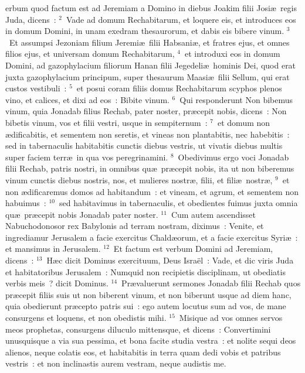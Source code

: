 \bchapter
{}erbum quod factum est ad Jeremiam a Domino in diebus Joakim filii Josi\ae\ regis Juda, dicens~:
${}^{2}$~Vade ad domum Rechabitarum, et loquere eis, et introduces eos in domum Domini, in unam exedram thesaurorum, et dabis eis bibere vinum.
${}^{3}$~Et assumpsi Jezoniam filium Jeremi\ae\ filii Habsani\ae , et fratres ejus, et omnes filios ejus, et universam domum Rechabitarum,
${}^{4}$~et introduxi eos in domum Domini, ad gazophylacium filiorum Hanan filii Jegedeli\ae\ hominis Dei, quod erat juxta gazophylacium principum, super thesaurum Maasi\ae\ filii Sellum, qui erat custos vestibuli~:
${}^{5}$~et posui coram filiis domus Rechabitarum scyphos plenos vino, et calices, et dixi ad eos~: Bibite vinum.
${}^{6}$~Qui responderunt Non bibemus vinum, quia Jonadab filius Rechab, pater noster, pr\ae cepit nobis, dicens~: Non bibetis vinum, vos et filii vestri, usque in sempiternum~:
${}^{7}$~et domum non \ae dificabitis, et sementem non seretis, et vineas non plantabitis, nec habebitis~: sed in tabernaculis habitabitis cunctis diebus vestris, ut vivatis diebus multis super faciem terr\ae\ in qua vos peregrinamini.
${}^{8}$~Obedivimus ergo voci Jonadab filii Rechab, patris nostri, in omnibus qu\ae\ pr\ae cepit nobis, ita ut non biberemus vinum cunctis diebus nostris, nos, et mulieres nostr\ae , filii, et fili\ae\ nostr\ae ,
${}^{9}$~et non \ae dificaremus domos ad habitandum~: et vineam, et agrum, et sementem non habuimus~:
${}^{10}$~sed habitavimus in tabernaculis, et obedientes fuimus juxta omnia qu\ae\ pr\ae cepit nobis Jonadab pater noster.
${}^{11}$~Cum autem ascendisset Nabuchodonosor rex Babylonis ad terram nostram, diximus~: Venite, et ingrediamur Jerusalem a facie exercitus Chald\ae orum, et a facie exercitus Syri\ae~: et mansimus in Jerusalem.
${}^{12}$~Et factum est verbum Domini ad Jeremiam, dicens~:
${}^{13}$~H\ae c dicit Dominus exercituum, Deus Isra\"el~: Vade, et dic viris Juda et habitatoribus Jerusalem~: Numquid non recipietis disciplinam, ut obediatis verbis meis~? dicit Dominus.
${}^{14}$~Pr\ae valuerunt sermones Jonadab filii Rechab quos pr\ae cepit filiis suis ut non biberent vinum, et non biberunt usque ad diem hanc, quia obedierunt pr\ae cepto patris sui~: ego autem locutus sum ad vos, de mane consurgens et loquens, et non obedistis mihi.
${}^{15}$~Misique ad vos omnes servos meos prophetas, consurgens diluculo mittensque, et dicens~: Convertimini unusquisque a via sua pessima, et bona facite studia vestra~: et nolite sequi deos alienos, neque colatis eos, et habitabitis in terra quam dedi vobis et patribus vestris~: et non inclinastis aurem vestram, neque audistis me.

